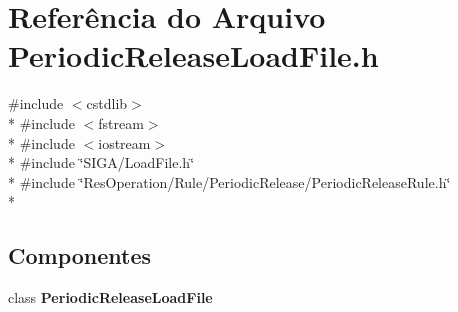 \section{Referência do Arquivo Periodic\+Release\+Load\+File.\+h}
\label{_periodic_release_load_file_8h}
{\ttfamily \#include $<$cstdlib$>$}\\*
{\ttfamily \#include $<$fstream$>$}\\*
{\ttfamily \#include $<$iostream$>$}\\*
{\ttfamily \#include \char`\"{}S\+I\+G\+A/\+Load\+File.\+h\char`\"{}}\\*
{\ttfamily \#include \char`\"{}Res\+Operation/\+Rule/\+Periodic\+Release/\+Periodic\+Release\+Rule.\+h\char`\"{}}\\*
\subsection*{Componentes}
\begin{DoxyCompactItemize}
\item 
class {\bf Periodic\+Release\+Load\+File}
\end{DoxyCompactItemize}
